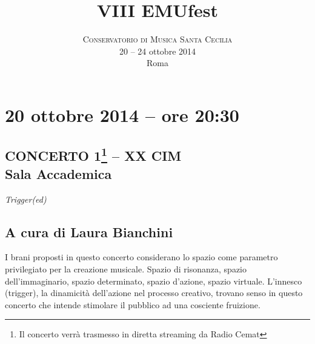 \documentclass[9pt, twoside, a5paper]{extreport}
\title{\vspace{-15mm}\fontsize{50}{50}\selectfont\textbf{VIII EMUfest}} %
\author{
	\large
	\textsc{Conservatorio di Musica Santa Cecilia} \\
	\large 20 -- 24 ottobre 2014 \\
	\large Roma
}
\date{}
\begin{document}
\pagestyle{empty}
\maketitle %



\section*{20 ottobre 2014 -- ore 20:30}
\subsection*{{\small CONCERTO 1\footnote{{\normalsize Il concerto verrà trasmesso in diretta streaming da Radio Cemat}} -- XX CIM\\} \textsf{Sala Accademica\\}}

{\fontsize{30}{30}\selectfont \textit{Trigger(ed)}}

\subsection*{\textsf{A cura di Laura Bianchini}}

{\fontsize{8}{8}\selectfont I brani proposti in questo concerto considerano lo spazio come parametro privilegiato per la creazione musicale.
Spazio di risonanza, spazio dell’immaginario, spazio determinato, spazio d’azione, spazio virtuale.
L’innesco (trigger), la dinamicità dell’azione nel processo creativo, trovano senso in questo concerto che intende stimolare il pubblico ad una cosciente fruizione.}

\bigskip
\end{document}
